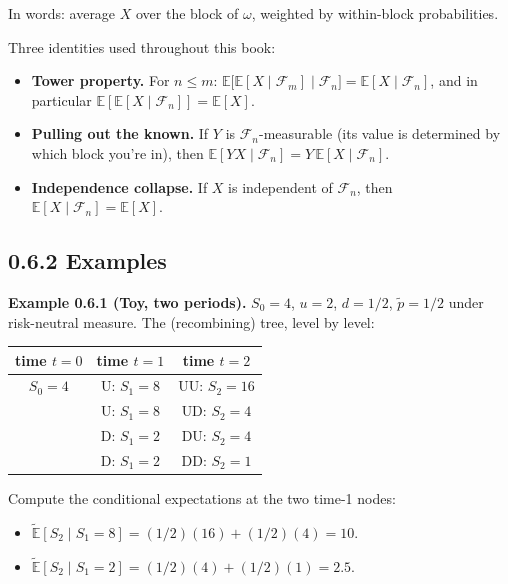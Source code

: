 \documentclass[
  10pt,
  twoside]{book}
\newcounter{none} %
\providecommand{\tightlist}{%
  \setlength{\itemsep}{0pt}\setlength{\parskip}{0pt}}
\begin{document}
In words: average \(X\) over the block of \(\omega\), weighted by
within-block probabilities.

Three identities used throughout this book:

\begin{itemize}
\tightlist
\item
  \textbf{Tower property.} For \(n \leq m\):
  \(\mathbb{E}\bigl[\mathbb{E}[X \mid \mathcal{F}_m] \mid \mathcal{F}_n\bigr] = \mathbb{E}[X \mid \mathcal{F}_n]\),
  and in particular
  \(\mathbb{E}[\mathbb{E}[X \mid \mathcal{F}_n]] = \mathbb{E}[X]\).
\item
  \textbf{Pulling out the known.} If \(Y\) is
  \(\mathcal{F}_n\)-measurable (its value is determined by which block
  you're in), then
  \(\mathbb{E}[Y X \mid \mathcal{F}_n] = Y \,\mathbb{E}[X \mid \mathcal{F}_n]\).
\item
  \textbf{Independence collapse.} If \(X\) is independent of
  \(\mathcal{F}_n\), then
  \(\mathbb{E}[X \mid \mathcal{F}_n] = \mathbb{E}[X]\).
\end{itemize}

\subsection{0.6.2 Examples}\label{examples-5}

\textbf{Example 0.6.1 (Toy, two periods).} \(S_0 = 4\), \(u = 2\),
\(d = 1/2\), \(\tilde p = 1/2\) under risk-neutral measure. The
(recombining) tree, level by level:

{\def\LTcaptype{none} %
\begin{table}[H]
\centering
\begin{tabular}{|c|c|c|}
\toprule
time \(t=0\) & time \(t=1\) & time \(t=2\) \\
\midrule



\(S_0 = 4\) & U: \(S_1 = 8\) & UU: \(S_2 = 16\) \\
& U: \(S_1 = 8\) & UD: \(S_2 = 4\) \\
& D: \(S_1 = 2\) & DU: \(S_2 = 4\) \\
& D: \(S_1 = 2\) & DD: \(S_2 = 1\) \\
\bottomrule
\end{tabular}
\end{table}
}

Compute the conditional expectations at the two time-1 nodes:

\begin{itemize}
\tightlist
\item
  \(\tilde{\mathbb{E}}[S_2 \mid S_1 = 8] = (1/2)(16) + (1/2)(4) = 10\).
\item
  \(\tilde{\mathbb{E}}[S_2 \mid S_1 = 2] = (1/2)(4) + (1/2)(1) = 2.5\).
\end{itemize}
\end{document}
